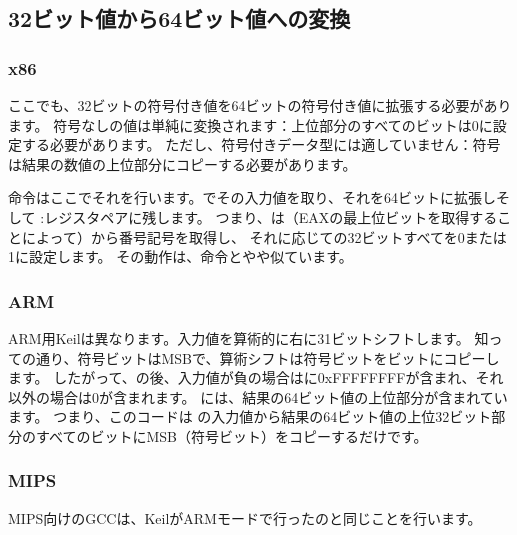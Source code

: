 ﻿\subsection{32ビット値から64ビット値への変換}
\label{subsec:sign_extending_32_to_64}



\subsubsection{x86}



ここでも、32ビットの符号付き値を64ビットの符号付き値に拡張する必要があります。 
符号なしの値は単純に変換されます：上位部分のすべてのビットは0に設定する必要があります。
ただし、符号付きデータ型には適していません：符号は結果の数値の上位部分にコピーする必要があります。

命令はここでそれを行います。\EAX{}でその入力値を取り、それを64ビットに拡張しそして
\EDX{}:\EAX{}レジスタペアに残します。
つまり、は（EAXの最上位ビットを取得することによって）\EAX{}から番号記号を取得し、
それに応じて\EDX{}の32ビットすべてを0または1に設定します。
その動作は、\MOVSX{}命令とやや似ています。

\subsubsection{ARM}



ARM用Keilは異なります。入力値を算術的に右に31ビットシフトします。 
知っての通り、符号ビットは\ac{MSB}で、算術シフトは符号ビットをビットにコピーします。 
したがって、の後、入力値が負の場合はに0xFFFFFFFFが含まれ、それ以外の場合は0が含まれます。 
には、結果の64ビット値の上位部分が含まれています。 
つまり、このコードは の入力値から結果の64ビット値の上位32ビット部分のすべてのビットに\ac{MSB}（符号ビット）をコピーするだけです。

\subsubsection{MIPS}

MIPS向けのGCCは、KeilがARMモードで行ったのと同じことを行います。


